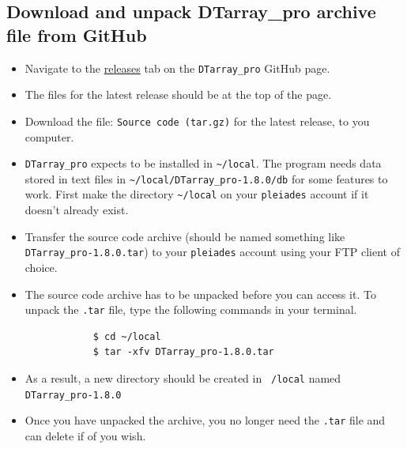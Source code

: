 \documentclass[12pt]{article}
\newcommand{\VERSION}{1.8.0}
\begin{document}
	\subsection{Download and unpack DTarray\_pro archive file from GitHub}
	\begin{itemize}
		\item Navigate to the \href{https://github.com/ajmaurais/DTarray_pro/releases}{releases} tab on the \texttt{DTarray\_pro} GitHub page.
		
		\item The files for the latest release should be at the top of the page.
		
		\item Download the file: \texttt{Source code (tar.gz)} for the latest release, to you computer.
		
		\item \texttt{DTarray\_pro} expects to be installed in \texttt{\textasciitilde/local}. The program needs data stored in text files in \texttt{\textasciitilde/local/DTarray\_pro-\VERSION/db} for some features to work. First make the directory \texttt{\textasciitilde/local} on your \texttt{pleiades} account if it doesn't already exist.
		
		\item Transfer the source code archive (should be named something like \texttt{DTarray\_pro-\VERSION.tar}) to your \texttt{pleiades} account using your FTP client of choice.	
		
		\item The source code archive has to be unpacked before you can access it. To unpack the \texttt{.tar} file, type the following commands in your terminal.
		
		\begin{lstlisting}
			$ cd ~/local
			$ tar -xfv DTarray_pro-1.8.0.tar
		\end{lstlisting}
		
		\item As a result, a new directory should be created in \texttt{~/local} named \texttt{DTarray\_pro-\VERSION}
		
		\item Once you have unpacked the archive, you no longer need the \texttt{.tar} file and can delete if of you wish.
		
	\end{itemize}
\end{document}
